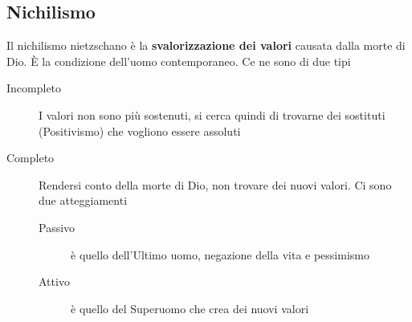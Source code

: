 \subsection{Nichilismo}
Il nichilismo nietzschano è la \textbf{svalorizzazione dei valori} causata dalla morte di Dio. È la
condizione dell'uomo contemporaneo. Ce ne sono di due tipi
\begin{description}
  \item[Incompleto] I valori non sono più sostenuti, si cerca quindi di trovarne dei sostituti 
    (Positivismo) che vogliono essere assoluti
  \item[Completo] Rendersi conto della morte di Dio, non trovare dei nuovi valori. Ci sono due 
    atteggiamenti
    \begin{description}
      \item[Passivo] è quello dell'Ultimo uomo, negazione della vita e pessimismo
      \item[Attivo] è quello del Superuomo che crea dei nuovi valori
    \end{description}
\end{description}
